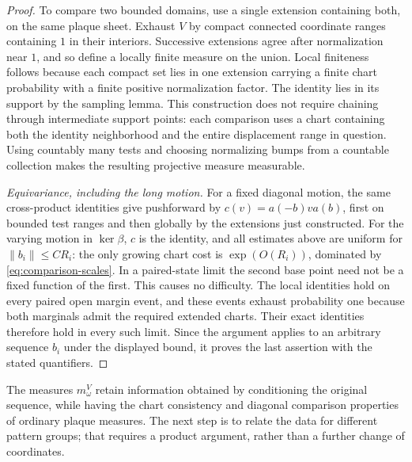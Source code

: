 \begin{proof}
To compare two bounded domains, use a single extension containing
both, on the same plaque sheet. Exhaust $V$ by compact connected
coordinate ranges containing $1$ in their interiors. Successive
extensions agree after normalization near $1$, and so define a
locally finite measure on the union. Local finiteness follows
because each compact set lies in one extension carrying a finite
chart probability with a finite positive normalization factor.
The identity lies in its support by the sampling lemma. This
construction does not require chaining through intermediate support
points: each comparison uses a chart containing both the identity
neighborhood and the entire displacement range in question.
Using countably many tests and choosing normalizing bumps from a
countable collection makes the resulting projective measure
measurable.

\smallskip\noindent
\emph{Equivariance, including the long motion.}
For a fixed diagonal motion, the same cross-product identities
give pushforward by $c(v)=a(-b)va(b)$, first on bounded test ranges
and then globally by the extensions just constructed. For the
varying motion in $\ker\beta$, $c$ is the identity, and all estimates
above are uniform for $\|b_i\|\le CR_i$: the only growing chart cost
is $\exp(O(R_i))$, dominated by
\eqref{eq:comparison-scales}. In a paired-state limit the second
base point need not be a fixed function of the first. This causes
no difficulty. The local identities hold on every paired open
margin event, and these events exhaust probability one because
both marginals admit the required extended charts. Their exact
identities therefore hold in every such limit. Since the argument
applies to an arbitrary sequence $b_i$ under the displayed bound,
it proves the last assertion with the stated quantifiers.
\end{proof}

The measures $m^V_\omega$ retain information obtained by conditioning
the original sequence, while having the chart consistency and
diagonal comparison properties of ordinary plaque measures. The
next step is to relate the data for different pattern groups;
that requires a product argument, rather than a further change of
coordinates.

